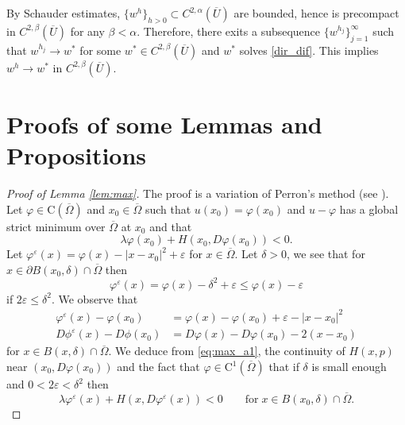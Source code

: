 \documentclass[11pt,reqno]{amsart}
\numberwithin{figure}{section}
\theoremstyle{plain}
\theoremstyle{remark}
\numberwithin{equation}{section}
\newcommand{\rmC}{\mathrm{C}}
\begin{document}
\begin{appendices}
By Schauder estimates, $\{w^h\}_{h>0} \subset C^{2, \alpha}(\overline{U})$ are bounded, hence is precompact in $ C^{2, \beta}(\overline{U})$ for any $\beta < \alpha$. Therefore, there exits a subsequence $\{w^{h_j}\}_{j=1}^\infty$ such that $w^{h_j} \to w^\ast$ for some $w^\ast \in  C^{2, \beta}(\overline{U}) $ and $w^\ast$ solves \eqref{dir_dif}. This implies $w^h \to w^\ast$ in $C^{2, \beta}(\overline{U})$.


\section{Proofs of some Lemmas and Propositions}
\begin{proof}[Proof of Lemma \ref{lem:max}] The proof is a variation of Perron's method (see \cite{Capuzzo-Dolcetta1990}). Let $\varphi\in \rmC(\overline{\Omega})$ and $x_0\in \overline{\Omega}$ such that $u(x_0) = \varphi(x_0)$ and $u-\varphi$ has a global strict minimum over $\overline{\Omega}$ at $x_0$ and that 
\begin{equation}\label{eq:max_a1}
    \lambda \varphi(x_0) + H(x_0,D\varphi(x_0)) < 0.
\end{equation}
Let $\varphi^\varepsilon(x) = \varphi(x) - |x-x_0|^2 + \varepsilon$ for $x\in \overline{\Omega}$. Let $\delta > 0$, we see that for $x\in \partial B(x_0,\delta)\cap \overline{\Omega}$ then
\begin{equation*}
    \varphi^\varepsilon(x) = \varphi(x) - \delta^2 +\varepsilon \leq \varphi(x) - \varepsilon
\end{equation*}
if $2\varepsilon \leq \delta^2$. We observe that
\begin{equation*}
    \begin{split}
    \varphi^\varepsilon(x) - \varphi(x_0)  &= \varphi(x)-\varphi(x_0) + \varepsilon - |x-x_0|^2 \\
    D\phi^\varepsilon(x) - D\phi(x_0) &= D\varphi(x) - D\varphi(x_0) - 2(x-x_0)
    \end{split}
\end{equation*}
for $x\in B(x,\delta)\cap \overline{\Omega}$. We deduce from \eqref{eq:max_a1}, the continuity of $H(x,p)$ near $(x_0,D\varphi(x_0))$ and the fact that $\varphi\in \rmC^1(\overline{\Omega})$ that if $\delta$ is small enough and $0<2\varepsilon < \delta^2$ then
\begin{equation}\label{eq:max_a2}
    \lambda \varphi^\varepsilon(x)+H(x,D\varphi^\varepsilon(x)) < 0 \qquad\text{for}\;x\in B(x_0,\delta)\cap \overline{\Omega}.
\end{equation}

\end{proof}
\end{appendices}
\end{document}
